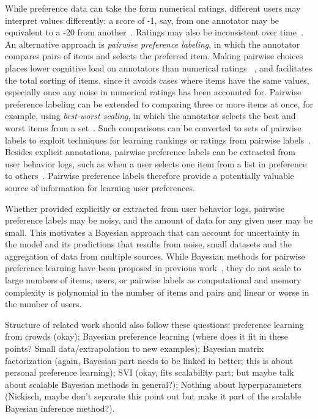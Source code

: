 While preference data can take the form numerical ratings,
different users may interpret values differently: a score of -1, say, from one annotator may be equivalent to a -20 from another~\cite{?}. Ratings may also be inconsistent
over time~\cite{?}. 
An alternative approach is \emph{pairwise preference labeling}, 
in which the annotator compares pairs of items and selects the preferred item.
Making pairwise choices places lower cognitive load on annotators than numerical ratings ~\citep{kendall1948rank,kingsley2010},
and facilitates the total sorting of items, since it avoids cases where items have the same values, especially once any noise in numerical ratings has been accounted for.
Pairwise preference labeling can be extended to comparing three or more items at once, for example, using 
\emph{best-worst scaling}, in which the annotator selects the best and worst items from a set~\cite{??}. 
Such comparisons can be converted to sets of pairwise labels to exploit techniques for 
learning rankings or ratings from pairwise labels~\cite{billions of things}.
Besides explicit annotations, pairwise preference labels can be extracted from
user behavior logs, such as when a user selects one item from a list in preference
to others~\cite{}. Pairwise preference labels therefore provide a potentially valuable
source of information for learning user preferences.

Whether provided explicitly or extracted from user behavior logs,
pairwise preference labels may be noisy, and the amount of 
data for any given user may be small.
This motivates a Bayesian approach that can account for uncertainty in the model 
and its predictions that results from noise, 
small datasets and the aggregation of data from multiple sources.
While Bayesian methods for pairwise preference learning have been proposed
in previous work~\cite{chu2009preference,houlsby2012collaborative,khan2014scalable}, they do not scale to large numbers of items, users, or
pairwise labels as computational and memory complexity is polynomial in the number
of items and pairs and linear or worse in the number of users.

Structure of related work should also follow these questions:
preference learning from crowds (okay); 
Bayesian preference learning (where does it fit in these points? Small data/extrapolation to new examples);
Bayesian matrix factorization (again, Bayesian part needs to be linked in better; this is about personal preference learning);
SVI (okay, fits scalability part; but maybe talk about scalable Bayesian methods in general?);
Nothing about hyperparameters (Nickisch, maybe don't separate this point out but make it part of the scalable Bayesian inference method?).

